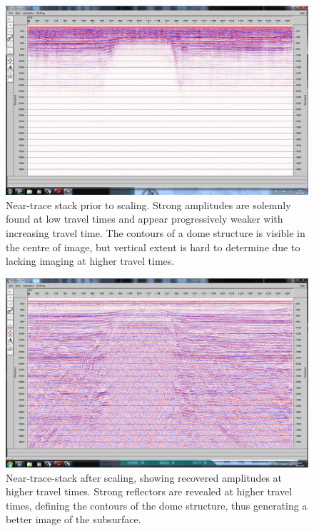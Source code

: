 \documentclass[10pt,a4paper]{article}
\begin{document}
\begin{figure}[H]
\includegraphics[width=\textwidth, trim={1.5cm 1.5cm 1cm 1.5cm},clip]{fig3.jpg}
\caption{Near-trace stack prior to scaling. Strong amplitudes are solemnly found at low travel times and appear progressively weaker with increasing travel time. The contours of a dome structure is visible in the centre of image, but vertical extent is hard to determine due to lacking imaging at higher travel times.}
\label{fig3}
\end{figure}

\begin{figure}[H]
\includegraphics[width=\textwidth, trim={1.5cm 1.5cm 1cm 1.5cm},clip]{fig4.jpg}
\caption{Near-trace-stack after scaling, showing recovered amplitudes at higher travel times. Strong reflectors are revealed at higher travel times, defining the contours of the dome structure, thus generating a better image of the subsurface.}
\label{fig4}
\end{figure}
\end{document}
